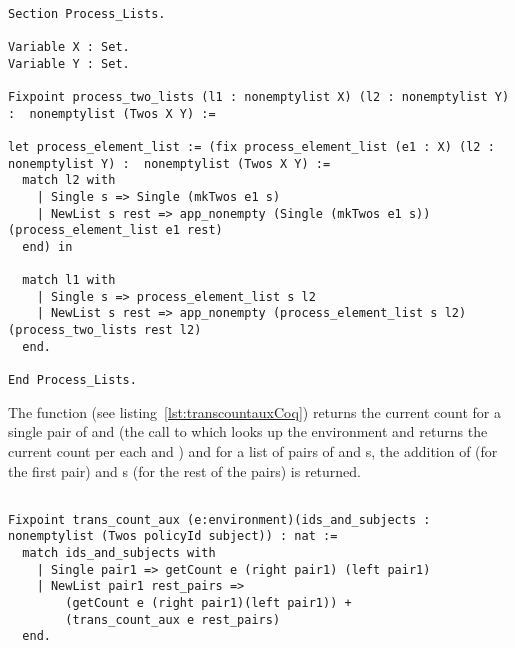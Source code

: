 \begin{lstlisting}

Section Process_Lists.

Variable X : Set.
Variable Y : Set.

Fixpoint process_two_lists (l1 : nonemptylist X) (l2 : nonemptylist Y) :  nonemptylist (Twos X Y) :=

let process_element_list := (fix process_element_list (e1 : X) (l2 : nonemptylist Y) :	nonemptylist (Twos X Y) :=
  match l2 with
    | Single s => Single (mkTwos e1 s)
    | NewList s rest => app_nonempty (Single (mkTwos e1 s)) (process_element_list e1 rest)
  end) in

  match l1 with
    | Single s => process_element_list s l2
    | NewList s rest => app_nonempty (process_element_list s l2) (process_two_lists rest l2)
  end.

End Process_Lists.

\end{lstlisting}


The function  (see listing~\ref{lst:transcountauxCoq}) returns the current count for a single pair of  and  (the call to  which looks up the environment  and returns the current count per each  and ) and for a list of pairs of  and s, the addition of  (for the first pair) and s (for the rest of the pairs) is returned. 

\begin{minipage}[c]{0.95\textwidth}
\begin{lstlisting}

Fixpoint trans_count_aux (e:environment)(ids_and_subjects : nonemptylist (Twos policyId subject)) : nat :=
  match ids_and_subjects with
	| Single pair1 => getCount e (right pair1) (left pair1)
	| NewList pair1 rest_pairs =>
	    (getCount e (right pair1)(left pair1)) +
	    (trans_count_aux e rest_pairs)
  end.
\end{lstlisting}
\end{minipage}




